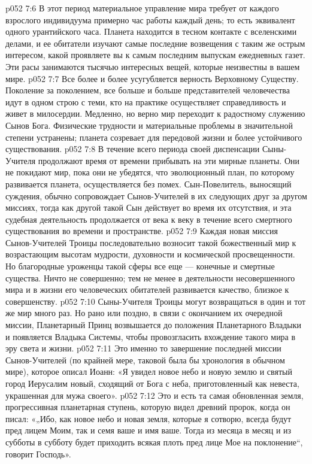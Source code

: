\vs p052 7:6 В этот период материальное управление мира требует от каждого взрослого индивидуума примерно час работы каждый день; то есть эквивалент одного урантийского часа. Планета находится в тесном контакте с вселенскими делами, и ее обитатели изучают самые последние возвещения с таким же острым интересом, какой проявляете вы к самым последним выпускам ежедневных газет. Эти расы занимаются тысячью интересных вещей, которые неизвестны в вашем мире.
\vs p052 7:7 \pc Все более и более усугубляется верность Верховному Существу. Поколение за поколением, все больше и больше представителей человечества идут в одном строю с теми, кто на практике осуществляет справедливость и живет в милосердии. Медленно, но верно мир переходит к радостному служению Сынов Бога. Физические трудности и материальные проблемы в значительной степени устранены; планета созревает для передовой жизни и более устойчивого существования.
\vs p052 7:8 \pc В течение всего периода своей диспенсации Сыны\hyp{}Учителя продолжают время от времени прибывать на эти мирные планеты. Они не покидают мир, пока они не убедятся, что эволюционный план, по которому развивается планета, осуществляется без помех. Сын\hyp{}Повелитель, выносящий суждения, обычно сопровождает Сынов\hyp{}Учителей в их следующих друг за другом миссиях, тогда как другой такой Сын действует во время их отсутствия, и эта судебная деятельность продолжается от века к веку в течение всего смертного существования во времени и пространстве.
\vs p052 7:9 Каждая новая миссия Сынов\hyp{}Учителей Троицы последовательно возносит такой божественный мир к возрастающим высотам мудрости, духовности и космической просвещенности. Но благородные уроженцы такой сферы все еще --- конечные и смертные существа. Ничто не совершенно; тем не менее в деятельности несовершенного мира и в жизни его человеческих обитателей развивается качество, близкое к совершенству.
\vs p052 7:10 \pc Сыны\hyp{}Учителя Троицы могут возвращаться в один и тот же мир много раз. Но рано или поздно, в связи с окончанием их очередной миссии, Планетарный Принц возвышается до положения Планетарного Владыки и появляется Владыка Системы, чтобы провозгласить вхождение такого мира в эру света и жизни.
\vs p052 7:11 Это именно то завершение последней миссии Сынов\hyp{}Учителей (по крайней мере, таковой была бы хронология в обычном мире), которое описал Иоанн: «Я увидел новое небо и новую землю и святый город Иерусалим новый, сходящий от Бога с неба, приготовленный как невеста, украшенная для мужа своего».
\vs p052 7:12 Это и есть та самая обновленная земля, прогрессивная планетарная ступень, которую видел древний пророк, когда он писал: «„Ибо, как новое небо и новая земля, которые я сотворю, всегда будут пред лицем Моим, так и семя ваше и имя ваше. Тогда из месяца в месяц и из субботы в субботу будет приходить всякая плоть пред лице Мое на поклонение“, говорит Господь».

